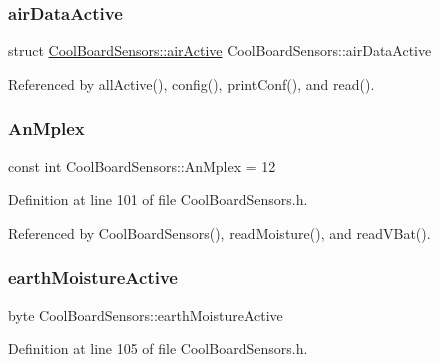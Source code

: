 \subsubsection{\texorpdfstring{air\+Data\+Active}{airDataActive}}
{\footnotesize\ttfamily struct \hyperlink{structCoolBoardSensors_1_1airActive}{Cool\+Board\+Sensors\+::air\+Active} Cool\+Board\+Sensors\+::air\+Data\+Active\hspace{0.3cm}{\ttfamily [private]}}



Referenced by all\+Active(), config(), print\+Conf(), and read().

\mbox{\label{classCoolBoardSensors_a12ef28b1046219e0aee10bf64e28c4a5}} 
\subsubsection{\texorpdfstring{An\+Mplex}{AnMplex}}
{\footnotesize\ttfamily const int Cool\+Board\+Sensors\+::\+An\+Mplex = 12\hspace{0.3cm}{\ttfamily [private]}}



Definition at line 101 of file Cool\+Board\+Sensors.\+h.



Referenced by Cool\+Board\+Sensors(), read\+Moisture(), and read\+V\+Bat().

\mbox{\label{classCoolBoardSensors_a46dfddb8a12720e92cd2825ef09023c8}} 
\subsubsection{\texorpdfstring{earth\+Moisture\+Active}{earthMoistureActive}}
{\footnotesize\ttfamily byte Cool\+Board\+Sensors\+::earth\+Moisture\+Active\hspace{0.3cm}{\ttfamily [private]}}



Definition at line 105 of file Cool\+Board\+Sensors.\+h.



